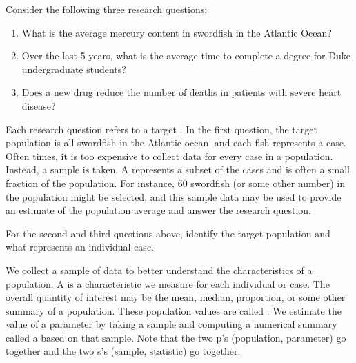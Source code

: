 Consider the following three research questions:
\begin{enumerate}
\setlength{\itemsep}{0mm}
\item What is the average mercury content in swordfish in the Atlantic Ocean?
\item\label{timeToGraduationQuestionForUCLAStudents} Over the last 5 years, what is the average time to complete a degree for Duke undergraduate students?
\item\label{identifyPopulationOfStentStudy} Does a new drug reduce the number of deaths in patients with severe heart disease?
\end{enumerate}
Each research question refers to a target . In the first question, the target population is all swordfish in the Atlantic ocean, and each fish represents a case. Often times, it is too expensive to collect data for every case in a population. Instead, a sample is taken. A  represents a subset of the cases and is often a small fraction of the population. For instance, 60 swordfish (or some other number) in the population might be selected, and this sample data may be used to provide an estimate of the population average and answer the research question.

\begin{exercisewrap}
\begin{nexercise} \label{identifyingThePopulationForTwoQuestionsInPopAndSampSubsection}
For the second and third questions above, identify the target population and what represents an individual case.\footnotemark
\end{nexercise}
\end{exercisewrap}

We collect a sample of data to better understand the characteristics of a population. A  is a characteristic we measure for each individual or case. The overall quantity of interest may be the mean, median, proportion, or some other summary of a population. These population values are called . We estimate the value of a parameter by taking a sample and computing a numerical summary called a  based on that sample. Note that the two p's (population, parameter) go together and the two s's (sample, statistic) go together.

